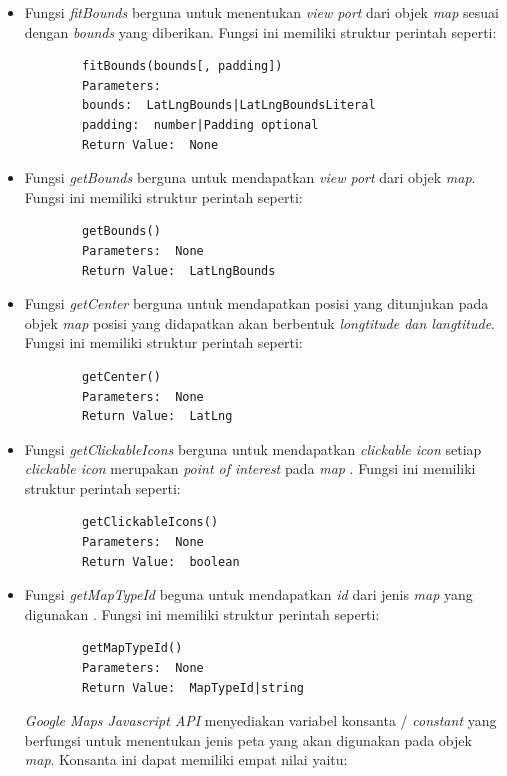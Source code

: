 \begin{itemize}
    \item Fungsi \textit{fitBounds}  berguna untuk menentukan \textit{view port} dari objek \textit{map} sesuai dengan \textit{bounds} yang diberikan. Fungsi ini memiliki struktur perintah seperti:
    \begin{lstlisting}
        fitBounds(bounds[, padding])
        Parameters: 
        bounds:  LatLngBounds|LatLngBoundsLiteral
        padding:  number|Padding optional
        Return Value:  None
    \end{lstlisting}
    \item Fungsi \textit{getBounds}  berguna untuk mendapatkan \textit{view port} dari objek \textit{map}. Fungsi ini memiliki struktur perintah seperti:
    \begin{lstlisting}
        getBounds()
        Parameters:  None
        Return Value:  LatLngBounds
    \end{lstlisting}
    \item Fungsi \textit{getCenter}  berguna untuk mendapatkan posisi yang ditunjukan pada objek \textit{map} posisi yang didapatkan akan berbentuk \textit{longtitude dan langtitude}. Fungsi ini memiliki struktur perintah seperti:
    \begin{lstlisting}
        getCenter()
        Parameters:  None
        Return Value:  LatLng
    \end{lstlisting}
    \item Fungsi \textit{getClickableIcons} berguna untuk mendapatkan \textit{clickable icon} setiap \textit{clickable icon} merupakan \textit{point of interest} pada \textit{map} . Fungsi ini memiliki struktur perintah seperti:
    \begin{lstlisting}
        getClickableIcons()
        Parameters:  None
        Return Value:  boolean
    \end{lstlisting}
    \item Fungsi \textit{getMapTypeId} beguna untuk mendapatkan \textit{id} dari jenis \textit{map} yang digunakan . Fungsi ini memiliki struktur perintah seperti:
    \begin{lstlisting}
        getMapTypeId()
        Parameters:  None
        Return Value:  MapTypeId|string
    \end{lstlisting}
    \textit{Google Maps Javascript API} menyediakan variabel konsanta / \textit{constant} yang berfungsi untuk menentukan jenis peta yang akan digunakan pada objek \textit{map}. Konsanta ini dapat memiliki empat nilai yaitu:
    \begin{itemize}

\end{itemize}
\end{itemize}
